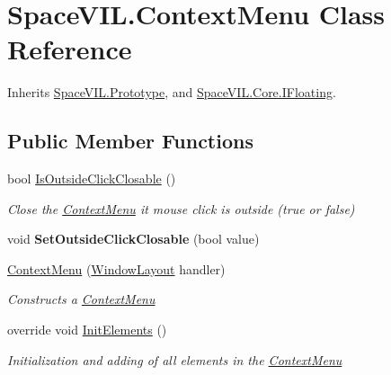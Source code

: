 \hypertarget{class_space_v_i_l_1_1_context_menu}{}\section{Space\+V\+I\+L.\+Context\+Menu Class Reference}
\label{class_space_v_i_l_1_1_context_menu}


Inherits \mbox{\hyperlink{class_space_v_i_l_1_1_prototype}{Space\+V\+I\+L.\+Prototype}}, and \mbox{\hyperlink{interface_space_v_i_l_1_1_core_1_1_i_floating}{Space\+V\+I\+L.\+Core.\+I\+Floating}}.

\subsection*{Public Member Functions}
\begin{DoxyCompactItemize}
\item 
bool \mbox{\hyperlink{class_space_v_i_l_1_1_context_menu_ab679391d913d15a6341e9ccb0f3b4bf9}{Is\+Outside\+Click\+Closable}} ()
\begin{DoxyCompactList}\small\item\em Close the \mbox{\hyperlink{class_space_v_i_l_1_1_context_menu}{Context\+Menu}} it mouse click is outside (true or false) \end{DoxyCompactList}\item 
\mbox{\label{class_space_v_i_l_1_1_context_menu_aac0e4cbcc49f86a04fbab993b35d84b9}} 
void {\bfseries Set\+Outside\+Click\+Closable} (bool value)
\item 
\mbox{\hyperlink{class_space_v_i_l_1_1_context_menu_ab5587faf5fcbe8af55b80295a481bdbc}{Context\+Menu}} (\mbox{\hyperlink{class_space_v_i_l_1_1_window_layout}{Window\+Layout}} handler)
\begin{DoxyCompactList}\small\item\em Constructs a \mbox{\hyperlink{class_space_v_i_l_1_1_context_menu}{Context\+Menu}} \end{DoxyCompactList}\item 
override void \mbox{\hyperlink{class_space_v_i_l_1_1_context_menu_ad29ab07bf8241bc770aecd96801a37d8}{Init\+Elements}} ()
\begin{DoxyCompactList}\small\item\em Initialization and adding of all elements in the \mbox{\hyperlink{class_space_v_i_l_1_1_context_menu}{Context\+Menu}} \end{DoxyCompactList}\item 

\end{DoxyCompactItemize}

